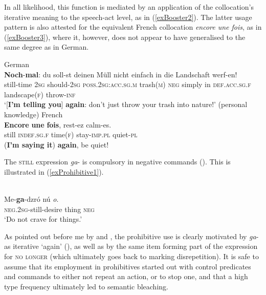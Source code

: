 In all likelihood, this function is mediated by an application of the collocation's iterative meaning to the speech-act level, as in (\ref{exBooster2}). The latter usage pattern is also attested for the equivalent French collocation \textit{encore une fois}, as in (\ref{exBooster3}), where it, however, does not appear to have generalised to the same degree as in German.

\begin{exe}
	\ex German\label{exBooster2}\\
	\gll \textbf{Noch}-\textbf{mal}: du soll-st deinen Müll nicht einfach in die Landschaft werf-en!\\
	still-time 2\textsc{sg} should-2\textsc{sg} \textsc{poss}.2\textsc{sg}:\textsc{acc}.\textsc{sg}.\textsc{m} trash(\textsc{m}) \textsc{neg} simply in \textsc{def}.\textsc{acc}.\textsc{sg}.\textsc{f} landscape(\textsc{f}) throw-\textsc{inf}\\
	\glt \lq [\textbf{I'm telling you}] \textbf{again}: don't just throw your trash into nature!' (personal knowledge)
	\ex French\label{exBooster3}\\
	\gll \textbf{Encore} \textbf{une} \textbf{fois}, rest-ez calm-es.\\
	still \textsc{indef}.\textsc{sg}.\textsc{f} time(\textsc{f}) stay-\textsc{imp}.\textsc{pl} quiet-\textsc{pl}\\
	\glt (\textbf{I'm saying it}) \textbf{again}, be quiet! \parencite[51 fn11]{Borillo1984}
\end{exe}

The  \textsc{still} expression \mbox{\textit{ga}-} is compulsory in negative commands (). This is illustrated in (\ref{exProhibitive1}).

\begin{exe}
	\ex {}\label{exProhibitive1}\\
	\gll Me-\textbf{ga}-dzró nú \textit{o}.\\
	\textsc{neg}.2\textsc{sg}-still-desire thing \textsc{neg}\\
	\glt \lq Do not crave for things.\rq{ }\parencite[358]{Ameka1991}
\end{exe}

As pointed out before me by \textcite[53]{Ameka1991} and \textcite[67 fn1]{Westermann1907}, the prohibitive use is clearly motivated by \mbox{\textit{ga}-} as iterative \lq again\rq{ } (), as well as by the same item forming part of the expression for \textsc{no longer} (which ultimately goes back to marking disrepetition). It is safe to assume that its employment in prohibitives started out with control predicates and commands to either not repeat an action, or to stop one, and that a high type frequency ultimately led to semantic bleaching.
